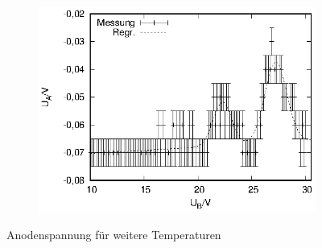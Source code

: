 \begin{figure}[h!]
\begin{subfigure}[h]{0.5\textwidth}
  \end{subfigure}%
  \begin{subfigure}[h]{0.5\textwidth}
    \centering
    \includegraphics{data/fh/181K4V.eps}
  \end{subfigure}
  \caption{Anodenspannung für weitere Temperaturen}
  \label{fig:kennlinien1}
\end{figure}

